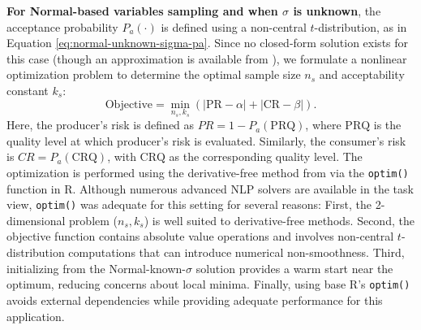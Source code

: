 \textbf{For Normal-based variables sampling and when \(\sigma\) is unknown}, the
acceptance probability \(P_a(\cdot)\) is defined using a non-central
\(t\)-distribution, as in Equation \eqref{eq:normal-unknown-sigma-pa}.
Since no closed-form solution exists for this case (though an approximation is
available from \citet{wilrich2004single}), we formulate a nonlinear optimization
problem to determine the optimal sample size \(n_s\) and acceptability constant
\(k_s\):
\begin{equation}
\text{Objective} = \min_{n_s, k_s} \left( 
\left| \text{PR} - \alpha \right| + 
\left| \text{CR} - \beta \right| 
\right). 
  \label{eq:normal-unknown-objective-func}
\end{equation}
Here, the producer's risk is defined as \(PR = 1 - P_a(\text{PRQ})\), where
\(\text{PRQ}\) is the quality level at which producer's risk is evaluated.
Similarly, the consumer's risk is \(CR = P_a(\text{CRQ})\), with
\(\text{CRQ}\) as the corresponding quality level.
The optimization is performed using the derivative-free method from \citet{nelder1965simplex}
via the \texttt{optim()} function in R. Although numerous advanced NLP solvers are
available in the  task view, \texttt{optim()} was adequate for this
setting for several reasons: First, the 2-dimensional problem (\(n_s, k_s\)) is
well suited to derivative-free methods. Second, the objective function contains
absolute value operations and involves non-central \(t\)-distribution computations
that can introduce numerical non-smoothness. Third, initializing from the
Normal-known-\(\sigma\) solution provides a warm start near the optimum, reducing
concerns about local minima. Finally, using base R's \texttt{optim()} avoids external
dependencies while providing adequate performance for this application.

